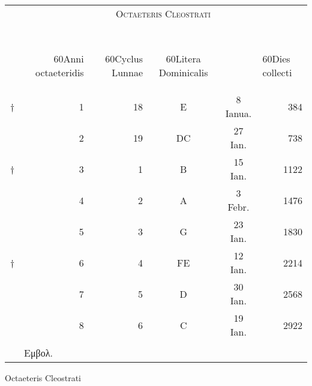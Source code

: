 %
\normalsize
\centering
\newcommand{\ang}{60}
\begin{tabular}[t]{r rrccr}
~ & \multicolumn{5}{c}{\textsc{Octaeteris Cleostrati}}\\
\\ %
\\
\\
\\
\\
~ &
\begin{rotate}{\ang}Anni octaeteridis\end{rotate} &
\begin{rotate}{\ang}Cyclus Lunnae\end{rotate} &
\begin{rotate}{\ang}Litera Dominicalis\end{rotate} &
~ &
\multicolumn{1}{l}{\begin{rotate}{\ang}Dies collecti\end{rotate}}
\\
\cline{2-6}
\scriptsize{†}
  &  1 & 18 &  E &  8 Ianua. &  384 \\
~ &  2 & 19 & DC & 27 Ian.   &  738 \\
\footnotesize{†}
  &  3 &  1 &  B & 15 Ian.   & 1122 \\
~ &  4 &  2 &  A &  3 Febr.  & 1476 \\
~ &  5 &  3 &  G & 23 Ian.   & 1830 \\
\footnotesize{†}
  &  6 &  4 & FE & 12 Ian.   & 2214 \\
~ &  7 &  5 &  D & 30 Ian.   & 2568 \\
~ &  8 &  6 &  C & 19 Ian.   & 2922 \\
\\
~ & \multicolumn{5}{l}{\footnotesize \super{†} \textgreek{Εμβολ.}}\\
\end{tabular}
\caption{Octaeteris Cleostrati}
\label{tab:p065}
%